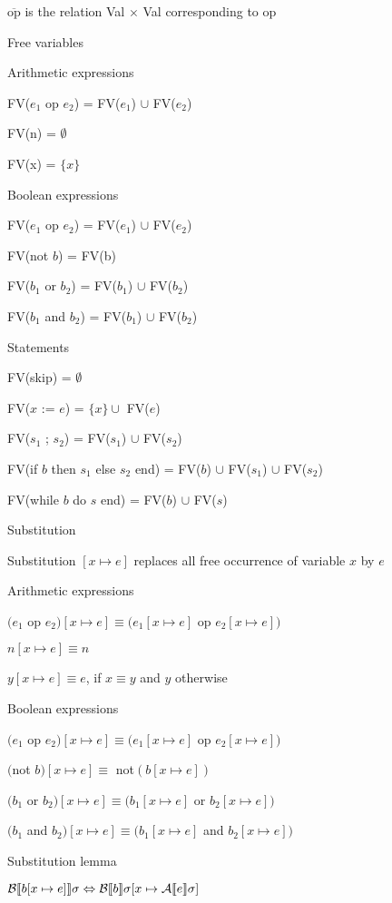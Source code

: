 		\item $\overline{\text{op}}$ is the relation Val $\times$ Val corresponding to op
	\enumend
	\item Free variables
	\enumstart
		\item Arithmetic expressions
		\enumstart
			\item FV($e_1$ op $e_2$) = FV($e_1$) $\cup$ FV($e_2$)
			\item FV(n) = $\emptyset$
			\item FV(x) = $\{x\}$
		\enumend
		\item Boolean expressions
		\enumstart
			\item FV($e_1$ op $e_2$) = FV($e_1$) $\cup$ FV($e_2$)
			\item FV(not $b$) = FV(b)
			\item FV($b_1$ or $b_2$) = FV($b_1$) $\cup$ FV($b_2$)
			\item FV($b_1$ and $b_2$) = FV($b_1$) $\cup$ FV($b_2$)
		\enumend
		\item Statements
		\enumstart
			\item FV(skip) = $\emptyset$
			\item FV($x$ := $e$) = $\{x\} \cup$ FV($e$)
			\item FV($s_1$ ; $s_2$) = FV($s_1$) $\cup$ FV($s_2$)
			\item FV(if $b$ then $s_1$ else $s_2$ end) = FV($b$) $\cup$ FV($s_1$) $\cup$ FV($s_2$)
			\item FV(while $b$ do $s$ end) = FV($b$) $\cup$  FV($s$)
		\enumend
	\enumend
	\item Substitution
	\enumstart
		\item Substitution $[x \mapsto e]$ replaces all free occurrence of variable $x$ by $e$
		\item Arithmetic expressions
		\enumstart
			\item $(e_1$ op $e_2)[x \mapsto e] \equiv (e_1[x \mapsto e]$ op $e_2[x \mapsto e])$
			\item $n[x \mapsto e] \equiv n$
			\item $y[x \mapsto e] \equiv e$, if $x \equiv y$ and $y$ otherwise
		\enumend
		\item Boolean expressions
		\enumstart
			\item $(e_1$ op $e_2)[x \mapsto e] \equiv (e_1[x \mapsto e]$ op $e_2[x \mapsto e])$
			\item $($not $b)[x \mapsto e] \equiv$ not$(b[x \mapsto e])$
			\item $(b_1$ or $b_2)[x \mapsto e] \equiv (b_1[x \mapsto e]$ or $b_2[x \mapsto e])$
			\item $(b_1$ and $b_2)[x \mapsto e] \equiv (b_1[x \mapsto e]$ and $b_2[x \mapsto e])$
		\enumend
		\item Substitution lemma
		\enumstart
			\item $\mathcal{B}\llbracket b[x \mapsto e] \rrbracket \sigma \Leftrightarrow \mathcal{B}\llbracket b \rrbracket \sigma[x \mapsto \mathcal{A}\llbracket e \rrbracket \sigma]$
		\enumend
	\enumend
\enumend
